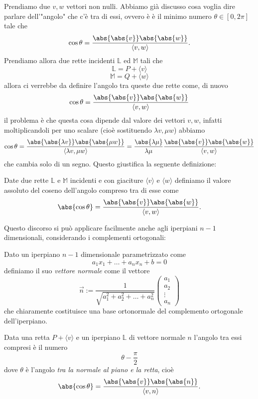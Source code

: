 \documentclass[11pt]{scrartcl}
\newcommand{\LL}{\mathbb{L}}
\begin{document}
   	 Prendiamo due $v,w$ vettori non nulli. Abbiamo già discusso cosa voglia dire parlare dell'"angolo" che c'è tra di essi, ovvero è è il minimo numero $\theta\in [0,2\pi]$ tale che
   	 $$\cos \theta=\frac{\abs{\abs{v}}\abs{\abs{w}}}{\langle v,w\rangle}.$$
   	 Prendiamo allora due rette incidenti $\LL$ ed $\mathbb{M}$ tali che
   	 $$\mathbb{L}=P+\langle v\rangle $$
   	 $$\mathbb{M}=Q+\langle w\rangle $$
   	 allora ci verrebbe da definire l'angolo tra queste due rette come, di nuovo
   	 $$\cos \theta=\frac{\abs{\abs{v}}\abs{\abs{w}}}{\langle v,w\rangle}$$
   	 il problema è che questa cosa dipende dal valore dei vettori $v,w$, infatti moltiplicandoli per uno scalare (cioè sostituendo $\lambda v,\mu w$) abbiamo
   	 $$\cos\theta=\frac{\abs{\abs{\lambda v}}\abs{\abs{\mu w}}}{\langle \lambda v,\mu w\rangle}=\frac{\abs{\lambda \mu} }{\lambda \mu}\frac{\abs{\abs{v}}\abs{\abs{w}}}{\langle v,w\rangle}$$
   	 che cambia solo di un segno. Questo giustifica la seguente definizione:
   	 \begin{definition}
   	 	Date due rette $\LL$ e $\mathbb{M}$ incidenti e con giaciture $\langle v\rangle$ e $\langle w \rangle$ definiamo il valore assoluto del coseno dell'angolo compreso tra di esse come
   	 	$$\abs{\cos \theta}=\frac{\abs{\abs{v}}\abs{\abs{w}}}{\langle v,w\rangle}.$$
   	 \end{definition}
   	 Questo discorso si può applicare facilmente anche agli iperpiani $n-1$ dimensionali, considerando i complementi ortogonali:
   	 \begin{definition}
   	 	Dato un iperpiano $n-1$ dimensionale parametrizzato come
   	 	$$a_1x_1+\dots+a_nx_n+b=0$$
   	 	definiamo il suo \textit{vettore normale} come il vettore
   	 	$$\vec{n}:=\frac{1}{\sqrt{a_1^2+a_2^2+\dots+a_n^2}}
   	 	\begin{pmatrix}
   	 		a_1 \\
   	 		a_2 \\
   	 		\vdots \\
   	 		a_n
   	 	\end{pmatrix}$$
   	 	che chiaramente costituisce una base ortonormale del complemento ortogonale dell'iperpiano.
   	 \end{definition}
   	 \begin{definition}
   	 	Data una retta $P+\langle v\rangle$ e un iperpiano $\mathbb{L}$ di vettore normale $n$ l'angolo tra essi compresi è il numero 
   	 	$$\theta-\frac{\pi}{2}$$
   	 	dove $\theta$ è l'angolo \textit{tra la normale al piano e la retta}, cioè
   	 	$$\abs{\cos\theta}=\frac{\abs{\abs{v}}\abs{\abs{n}}}{\langle v,n\rangle}.$$
   	 \end{definition}
   	 
\end{document}

